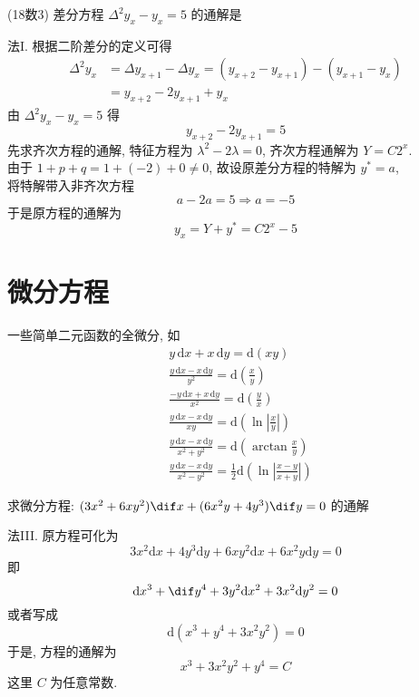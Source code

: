 \documentclass[color=green,titlestyle=hang]{elegantbook}%
\begin{document}
\begin{example}(18数3)
差分方程 $\Delta^2y_x-y_x=5$  的通解是\;\underline{}
\end{example}\begin{solution}
法I. 根据二阶差分的定义可得
\begin{align*}
\Delta^2y_x&=\Delta y_{x+1}-\Delta y_x=(y_{x+2}-y_{x+1})-(y_{x+1}-y_x)\\
&=y_{x+2}-2y_{x+1}+y_{x}
\end{align*}
由 $\Delta^2y_x-y_{x}=5$ 得 \[y_{x+2}-2y_{x+1}=5\]
先求齐次方程的通解, 特征方程为 $\lambda^2-2\lambda=0$, 齐次方程通解为 $Y=C2^x$. \\
由于 $1+p+q=1+(-2)+0\neq0$, 故设原差分方程的特解为 $y^*=a$, \\
将特解带入非齐次方程
\[a-2a=5\Longrightarrow a=-5\]
于是原方程的通解为 \[y_x=Y+y^*=C2^x-5\]
\end{solution}


\chapter{微分方程}

\begin{note}
一些简单二元函数的全微分, 如\begin{align*}
&y\,\mathrm{d}x+x\,\mathrm{d}y=\mathrm{d}(xy)\\
&\frac{y\,\mathrm{d}x-x\,\mathrm{d}y}{y^2}=\mathrm{d}\left(\frac{x}{y}\right)\\
&\frac{-y\,\mathrm{d}x+x\,\mathrm{d}y}{x^2}=\mathrm{d}\left(\frac{y}{x}\right)\\
&\frac{y\,\mathrm{d}x-x\,\mathrm{d}y}{xy}=\mathrm{d}\left(\ln\left|\frac{x}{y}\right|\right)\\
&\frac{y\,\mathrm{d}x-x\,\mathrm{d}y}{x^2+y^2}=\mathrm{d}\left(\arctan\frac{x}{y}\right)\\
&\frac{y\,\mathrm{d}x-x\,\mathrm{d}y}{x^2-y^2}=\frac{1}{2}\mathrm{d}\left(\ln\left|\frac{x-y}{x+y}\right|\right)
\end{align*}
\end{note}

\begin{exercise}
求微分方程: $(3x^2+6xy^2)\dif x+(6x^2y+4y^3)\dif y=0$ 的通解
\end{exercise}\begin{solution}
法III. 原方程可化为
\[3x^2\mathrm{d}x+4y^3\mathrm{d}y+6xy^2\mathrm{d}x+6x^2y\mathrm{d}y=0\]
即\[\mathrm{d}x^3+\dif y^4+3y^2\mathrm{d}x^2+3x^2\mathrm{d}y^2=0\]
或者写成\[\mathrm{d}(x^3+y^4+3x^2y^2)=0\]
于是, 方程的通解为\[x^3+3x^2y^2+y^4=C\]
这里 $C$ 为任意常数.\\
\end{solution}
\end{document}
